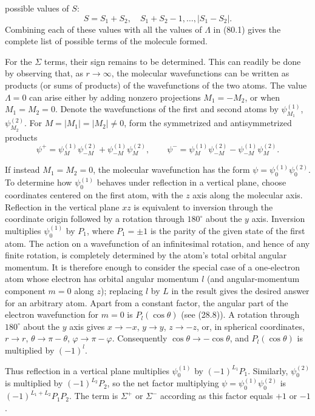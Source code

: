 possible values of $S$:
\begin{equation}
 S=S_1+S_2,\quad S_1+S_2-1,\ldots,|S_1-S_2|.
 \tag{80.2}
\end{equation}
Combining each of these values with all the values of $\Lambda$ in (80.1) gives the complete list of possible terms of the molecule formed.

For the $\Sigma$ terms, their sign remains to be determined. This can readily be done by observing that, as $r\to\infty$, the molecular wavefunctions can be written as products (or sums of products) of the wavefunctions of the two atoms. The value $\Lambda=0$ can arise either by adding nonzero projections $M_1=-M_2$, or when $M_1=M_2=0$. Denote the wavefunctions of the first and second atoms by $\psi_{M_1}^{(1)}$, $\psi_{M_2}^{(2)}$. For $M=|M_1|=|M_2|\ne0$, form the symmetrized and antisymmetrized products
\[
 \psi^+=\psi_M^{(1)}\psi_{-M}^{(2)}+\psi_{-M}^{(1)}\psi_M^{(2)},\qquad
 \psi^-=\psi_M^{(1)}\psi_{-M}^{(2)}-\psi_{-M}^{(1)}\psi_M^{(2)}.
\]


If instead $M_1=M_2=0$, the molecular wavefunction has the form $\psi=\psi_0^{(1)}\psi_0^{(2)}$. To determine how $\psi_0^{(1)}$ behaves under reflection in a vertical plane, choose coordinates centered on the first atom, with the $z$ axis along the molecular axis. Reflection in the vertical plane $xz$ is equivalent to inversion through the coordinate origin followed by a rotation through $180^\circ$ about the $y$ axis. Inversion multiplies $\psi_0^{(1)}$ by $P_1$, where $P_1=\pm1$ is the parity of the given state of the first atom. The action on a wavefunction of an infinitesimal rotation, and hence of any finite rotation, is completely determined by the atom's total orbital angular momentum. It is therefore enough to consider the special case of a one-electron atom whose electron has orbital angular momentum $l$ (and angular-momentum component $m=0$ along $z$); replacing $l$ by $L$ in the result gives the desired answer for an arbitrary atom. Apart from a constant factor, the angular part of the electron wavefunction for $m=0$ is $P_l(\cos\theta)$ (see (28.8)). A rotation through $180^\circ$ about the $y$ axis gives $x\to-x$, $y\to y$, $z\to-z$, or, in spherical coordinates, $r\to r$, $\theta\to\pi-\theta$, $\varphi\to\pi-\varphi$. Consequently $\cos\theta\to-\cos\theta$, and $P_l(\cos\theta)$ is multiplied by $(-1)^l$.

Thus reflection in a vertical plane multiplies $\psi_0^{(1)}$ by $(-1)^{L_1}P_1$. Similarly, $\psi_0^{(2)}$ is multiplied by $(-1)^{L_2}P_2$, so the net factor multiplying $\psi=\psi_0^{(1)}\psi_0^{(2)}$ is $(-1)^{L_1+L_2}P_1P_2$. The term is $\Sigma^+$ or $\Sigma^-$ according as this factor equals $+1$ or $-1$.

